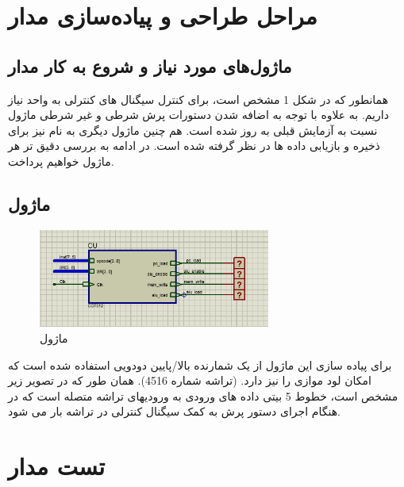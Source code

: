 \documentclass[12pt,onecolumn,a4paper,fleqn]{article}
\begin{document}
	\section{مراحل طراحی و پیاده‌سازی مدار}
	\subsection {ماژول‌های مورد نیاز و شروع به کار مدار}
	همانطور که در شکل 1 مشخص است، برای کنترل سیگنال های کنترلی به واحد  نیاز داریم. به علاوه با توجه به اضافه شدن دستورات پرش شرطی و غیر شرطی ماژول  نسبت به آزمایش قبلی به روز شده است. هم چنین ماژول دیگری به نام  نیز برای ذخیره و بازیابی داده ها در نظر گرفته شده است. در ادامه به بررسی دقیق تر هر ماژول خواهیم پرداخت.
	
		\subsection{ماژول }
			\begin{figure}[H]
						\centering
						\includegraphics[width=0.68\textwidth]{source/3.png}
						\caption{ماژول }
						\label{fig:3}
		\end{figure}
		
		برای پیاده سازی این ماژول از یک شمارنده بالا/پایین دودویی استفاده شده است که امکان لود موازی را نیز دارد. (تراشه شماره 4516). همان طور که در تصویر زیر مشخص است، خطوط 5 بیتی داده های ورودی به ورودیهای تراشه متصله است که در هنگام اجرای دستور پرش به کمک سیگنال کنترلی  در تراشه بار می شود. 
	
	\section{تست مدار}
\end{document}
